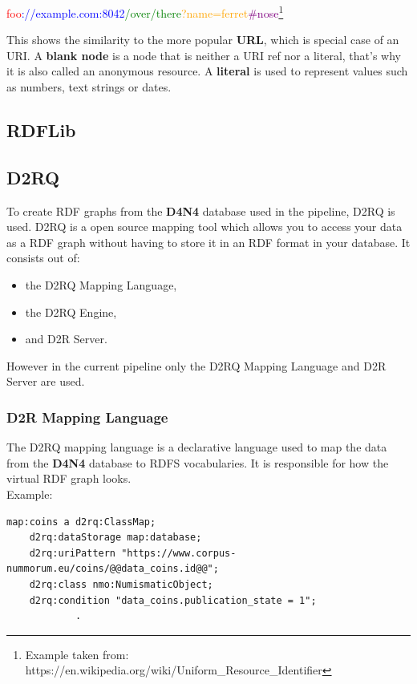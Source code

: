 \documentclass[12pt, oneside]{article}
\begin{document}
\begin{center}
    \textcolor{red}{foo}\textcolor{blue}{://example.com:8042}\textcolor{green}{/over/there}\textcolor{orange}{?name=ferret}\textcolor{purple}{\#nose}\footnote[6]{Example taken from: https://en.wikipedia.org/wiki/Uniform\_Resource\_Identifier}
\end{center}
This shows the similarity to the more popular \textbf{URL}, which is special case of an URI.
A \textbf{blank node} is a node that is neither a URI ref nor a literal, that's why it is also called an anonymous resource. A \textbf{literal} is used to represent  values such as numbers, text strings or dates.
\newpage
\subsection{RDFLib}
\newpage
\subsection{D2RQ} \label{d2r}
To create RDF graphs from the \textbf{D4N4} database used in the pipeline, D2RQ is used.  D2RQ is a open source mapping tool which allows you to access your data as a RDF graph without having to store it in an RDF format in your database. It consists out of:
\begin{itemize}
	\item the D2RQ Mapping Language,
	\item the D2RQ Engine,
	\item and D2R Server.
\end{itemize}
However in the current pipeline only the D2RQ Mapping Language and D2R Server are used.
\subsubsection{D2R Mapping Language}
The D2RQ mapping language is a declarative language used to map the data from the \textbf{D4N4} database to RDFS vocabularies. It is responsible for how the virtual RDF graph looks.\\
Example:
\begin{center}
\begin{BVerbatim}[fontsize=\small]
map:coins a d2rq:ClassMap;
	d2rq:dataStorage map:database;
	d2rq:uriPattern "https://www.corpus-nummorum.eu/coins/@@data_coins.id@@";
	d2rq:class nmo:NumismaticObject;
	d2rq:condition "data_coins.publication_state = 1";
			.
\end{BVerbatim}
\end{center}
\end{document}

